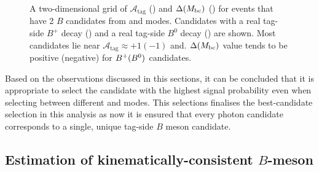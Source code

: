 \begin{figure}[htbp!]
    \centering
    \caption{\label{fig:selecting_tag_mode} A two-dimensional grid of $\mathcal{A}_{\mathrm{tag}}$ ()
    and $\Delta({M_{\mathrm{bc}}})$ () for events that have 2 $B$ candidates from \feiBp and \feiBz modes.
    Candidates with a real tag-side $B^+$ decay ()
    and a real tag-side $B^0$ decay () are shown.
    Most candidates lie near $\mathcal{A}_{\mathrm{tag}}\approx +1 (-1)$ and.
    $\Delta({M_{\mathrm{bc}}})$ value tends to be positive (negative) for $B^+(B^0)$ candidates.
    }
\end{figure}

Based on the observations discussed in this sections, it can be concluded that it is appropriate to select the \FEI candidate with the highest signal probability even when selecting between different \feiBp and \feiBz modes.
This selections finalises the best-candidate selection in this analysis as now it is ensured that every photon candidate corresponds to a single, unique tag-side $B$ meson candidate.

\subsection{Estimation of kinematically-consistent \texorpdfstring{$B$}{B}-meson}\label{sec:good_tag_definition}
